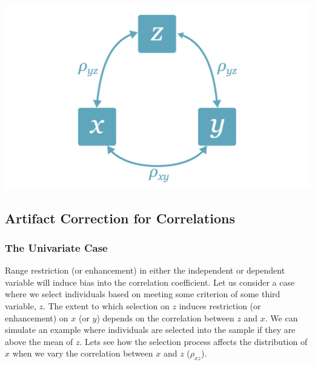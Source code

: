 \documentclass[
  letterpaper,
  DIV=11,
  numbers=noendperiod]{scrreprt}
\begin{document}
\includegraphics{figure/ind_selection.png}

\hypertarget{artifact-correction-for-correlations-1}{%
\subsection{Artifact Correction for
Correlations}\label{artifact-correction-for-correlations-1}}

\hypertarget{the-univariate-case-2}{%
\subsubsection*{The Univariate Case}\label{the-univariate-case-2}}

Range restriction (or enhancement) in either the independent or
dependent variable will induce bias into the correlation coefficient.
Let us consider a case where we select individuals based on meeting some
criterion of some third variable, \(z\). The extent to which selection
on \(z\) induces restriction (or enhancement) on \(x\) (or \(y\))
depends on the correlation between \(z\) and \(x\). We can simulate an
example where individuals are selected into the sample if they are above
the mean of \(z\). Lets see how the selection process affects the
distribution of \(x\) when we vary the correlation between \(x\) and
\(z\) (\(\rho_{xz}\)).
\end{document}
